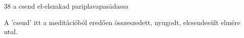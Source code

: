 
\begin{notesdescription}

\item[{38}
{a csend el-elszakad}
{pariplavapasādassa}] \hfill\par

A 'csend' itt a meditációból eredően összeszedett, nyugodt, elcsendesült elmére utal.

\end{notesdescription}

